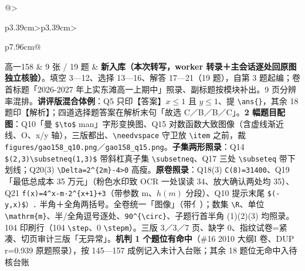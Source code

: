 \documentclass[a4paper,11pt]{article}
\begin{document}
\begin{xltabular}{\textwidth}{@{}>{\raggedright\arraybackslash}p{3.39cm}>{\centering\arraybackslash}p{3.39cm}>{\raggedright\arraybackslash}p{7.96cm}@{}}
高一158 & 9 张 / 19 题 & \textbf{新入库（本次转写，worker 转录＋主会话逐处回原图独立核验）}。填空 3---12、选择 13---16、解答 17---21（19 题），自第 3 题起编；卷首标题「2026-2027 年上实东滩高一上期中」照录、副标题按模块补出。9 页分辨率混排。\textbf{讲评版混合体例}：Q5 只印【答案】\(x\leqslant\allowbreak 1\) 且 \(y\leqslant\allowbreak 1\)、提 \texttt{\textbackslash{}ans\{\}}，其余 18 题印【解析】；四道选择题答案在解析末句「故选 C／B／B／C」。\textbf{2 幅题目配图}：Q10「曼 \texttt{\$\textbackslash{}to\$} man」字形变换图、Q15 对数函数大致图像（含虚线渐近线、O、x/y 轴），三版都出、\texttt{\textbackslash{}needvspace} 守卫放 \texttt{\textbackslash{}item} 之前，裁 \texttt{figures/\allowbreak{}gao158\_q10.png}／\texttt{gao158\_q15.png}。\textbf{子集两形照录}：Q14 \texttt{\$(2,3)\textbackslash{}subsetneq(1,3)\$} 带斜杠真子集 \texttt{\textbackslash{}subsetneq}、Q17 三处 \texttt{\textbackslash{}subseteq} 带下划线；Q20(3) \texttt{\textbackslash{}Delta=2\^{}\{2m\}-\allowbreak{}4\textgreater{}0} 高瘦。\textbf{原卷照录}：Q18(3) \texttt{C(8)=31400}、Q19「最低总成本 35 万元」（粉色水印致 OCR 一处误读 34、放大确认两处均 35）、Q21 \texttt{f(x)=4\^{}x-\allowbreak{}m·2\^{}\{x+1\}+3}（带参数 m、\(h(m)\) 分段）、Q10 提示末尾 \texttt{\$(-\allowbreak{}y,x)\$）.} 半角＋全角两括号。全卷统一「图像」（带亻）；数集 \texttt{\textbackslash{}R}、单位 \texttt{\textbackslash{}mathrm\{m\}}、半/全角逗号逐处、\texttt{90\^{}\{\textbackslash{}circ\}}、子题行首半角 (1)(2)(3) 均照录。104 印刷行（104 \texttt{\textbackslash{}step}、0 \texttt{\textbackslash{}stepm}）。三版 3／3／7 页、缺字 0、指纹试卷=紧凑、切页审计三版「无异常」。\textbf{机判 1 个题位有命中}（\#16 2010 大纲I 卷、DUP r=0.939 原题照录），按 145---157 成例记入未计入台账；其余 18 题位无命中入待核台账 \\ \addlinespace[1pt]

\end{xltabular}
\end{document}
